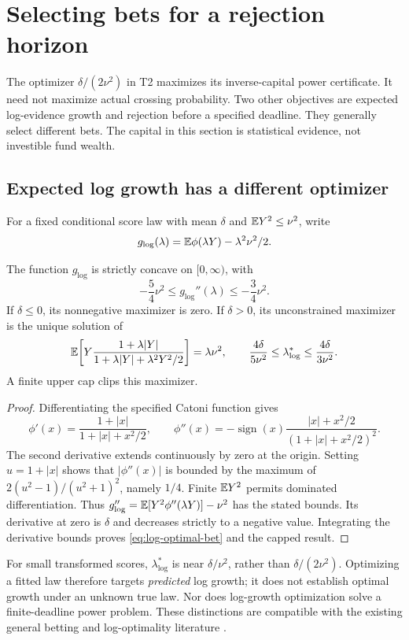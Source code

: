 \section{Selecting bets for a rejection horizon}
\label{sec:lambda-power}
The optimizer $\delta/(2\nu^2)$ in T2 maximizes its inverse-capital power
certificate. It need not maximize actual crossing probability. Two other
objectives are expected log-evidence growth and rejection before a specified
deadline. They generally select different bets. The capital in this section
is statistical evidence, not investible fund wealth.

\subsection{Expected log growth has a different optimizer}
For a fixed conditional score law with mean $\delta$ and
$\mathbb E Y^2\le\nu^2$, write
\[
 g_{\log}(\lambda)=\mathbb E\phi(\lambda Y)-\lambda^2\nu^2/2.
\]
\begin{proposition}
The function $g_{\log}$ is strictly concave on $[0,\infty)$, with
\[
 -\frac54\nu^2\le g_{\log}''(\lambda)\le-\frac34\nu^2.
\]
If $\delta\le0$, its nonnegative maximizer is zero. If $\delta>0$, its
unconstrained maximizer is the unique solution of
\begin{equation}
 \mathbb E\!\left[Y\frac{1+\lambda|Y|}
 {1+\lambda|Y|+\lambda^2Y^2/2}\right]=\lambda\nu^2,
 \qquad
 \frac{4\delta}{5\nu^2}\le\lambda_{\log}^*
 \le\frac{4\delta}{3\nu^2}.\label{eq:log-optimal-bet}
\end{equation}
A finite upper cap clips this maximizer.
\end{proposition}
\begin{proof}
Differentiating the specified Catoni function gives
\[
 \phi'(x)=\frac{1+|x|}{1+|x|+x^2/2},\qquad
 \phi''(x)=-\operatorname{sign}(x)
 \frac{|x|+x^2/2}{(1+|x|+x^2/2)^2}.
\]
The second derivative extends continuously by zero at the origin.
Setting $u=1+|x|$ shows that $|\phi''(x)|$ is bounded by the maximum of
$2(u^2-1)/(u^2+1)^2$, namely $1/4$. Finite $\mathbb E Y^2$ permits dominated
differentiation. Thus $g_{\log}''=\mathbb E[Y^2\phi''(\lambda Y)]-\nu^2$ has the
stated bounds. Its derivative at zero is $\delta$ and decreases strictly
to a negative value. Integrating the derivative bounds proves
\eqref{eq:log-optimal-bet} and the capped result.
\end{proof}

For small transformed scores, $\lambda_{\log}^*$ is near
$\delta/\nu^2$, rather than $\delta/(2\nu^2)$. Optimizing a fitted law
therefore targets \emph{predicted} log growth; it does not establish optimal
growth under an unknown true law. Nor does log-growth optimization solve a
finite-deadline power problem. These distinctions are compatible with the
existing general betting and log-optimality literature \cite{instance}.

